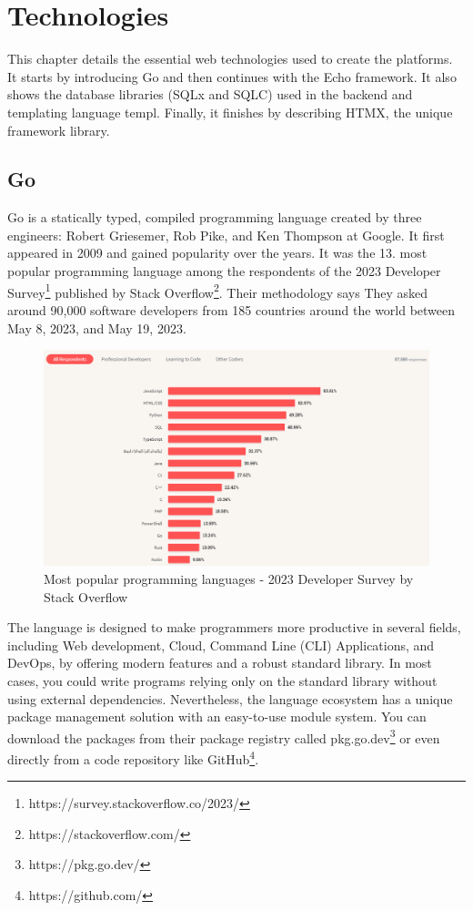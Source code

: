 \chapter{Technologies}\label{ch:technologies}

This chapter details the essential web technologies used to create the platforms. It starts by introducing Go and then continues with the Echo framework. It also shows the database libraries (SQLx and SQLC) used in the backend and templating language templ. Finally, it finishes by describing HTMX, the unique framework library.

\section{Go}
Go is a statically typed, compiled programming language created by three engineers: Robert Griesemer, Rob Pike, and Ken Thompson at Google. It first appeared in 2009 and gained popularity over the years. It was the 13. most popular programming language among the respondents of the 2023 Developer Survey\footnote{https://survey.stackoverflow.co/2023/} published by Stack Overflow\footnote{https://stackoverflow.com/}. Their methodology says They asked around 90,000 software developers from 185 countries around the world between May 8, 2023, and May 19, 2023.

\begin{figure}
    \centering
    \includegraphics[width=160mm, keepaspectratio]{figures/go-stack-overflow.png}
    \caption{Most popular programming languages - 2023 Developer Survey by Stack Overflow}
\end{figure}

The language is designed to make programmers more productive in several fields, including  Web development, Cloud, Command Line (CLI) Applications, and DevOps, by offering modern features and a robust standard library. In most cases, you could write programs relying only on the standard library without using external dependencies. Nevertheless, the language ecosystem has a unique package management solution with an easy-to-use module system. You can download the packages from their package registry called pkg.go.dev\footnote{https://pkg.go.dev/} or even directly from a code repository like GitHub\footnote{https://github.com/}.

